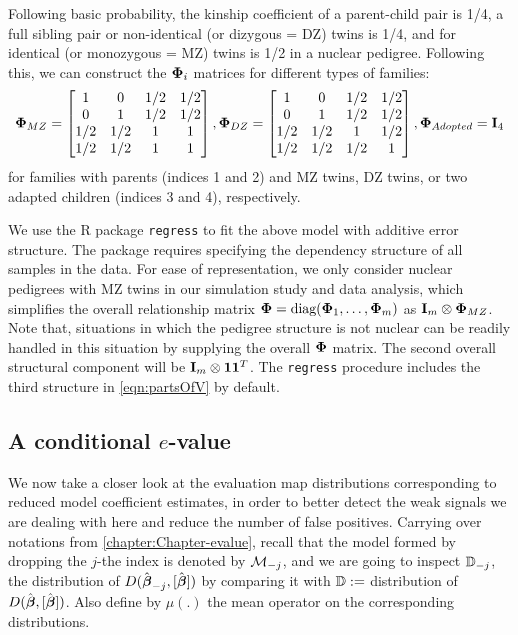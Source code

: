 Following basic probability, the kinship coefficient of a parent-child pair is 1/4, a full sibling pair or non-identical (or dizygous = DZ) twins is 1/4, and for identical (or monozygous = MZ) twins is 1/2 in a nuclear pedigree. Following this, we can construct the ${\boldsymbol{\Phi}}_i$ matrices for different types of families:
%
\begin{align*}
{\boldsymbol{\Phi}}_{MZ} = \begin{bmatrix}
1 & 0 & 1/2 & 1/2 \\
0 & 1 & 1/2 & 1/2 \\
1/2 & 1/2 & 1 & 1\\
1/2 & 1/2 & 1 & 1
\end{bmatrix},
{\boldsymbol{\Phi}}_{DZ} = \begin{bmatrix}
1 & 0 & 1/2 & 1/2 \\
0 & 1 & 1/2 & 1/2 \\
1/2 & 1/2 & 1 & 1/2\\
1/2 & 1/2 & 1/2 & 1
\end{bmatrix},
{\boldsymbol{\Phi}}_{Adopted} = {\mathbf{I}}_4
\end{align*}
%
for families with parents (indices 1 and 2) and MZ twins, DZ twins, or two adapted children (indices 3 and 4), respectively.

We use the R package \texttt{regress} to fit the above model with additive error structure. The package requires specifying the dependency structure of all samples in the data. For ease of representation, we only consider nuclear pedigrees with MZ twins in our simulation study and data analysis, which simplifies the overall relationship matrix ${\boldsymbol{\Phi}} = \text{diag} ( {\boldsymbol{\Phi}}_1, \ldots, {\boldsymbol{\Phi}}_m)$ as ${\mathbf{I}}_m \otimes {\boldsymbol{\Phi}}_{MZ}$. Note that, situations in which the pedigree structure is not nuclear can be readily handled in this situation by supplying the overall ${\boldsymbol{\Phi}}$ matrix. The second overall structural component will be  ${\mathbf{I}}_m \otimes {\bf 1} {\bf 1}^T$. The \texttt{regress} procedure includes the third structure in \ref{eqn:partsOfV} by default.

\subsection{A conditional $e$-value}
We now take a closer look at the evaluation map distributions corresponding to reduced model coefficient estimates, in order to better detect the weak signals we are dealing with here and reduce the number of false positives. Carrying over notations from \ref{chapter:Chapter-evalue}, recall that the model formed by dropping the $j$-the index is denoted by ${\cal{M}}_{-j}$, and we are going to inspect ${\mathbb{D}}_{-j}$, the distribution of $D( \hat {{\boldsymbol{\beta}}}_{-j}, [\hat {{\boldsymbol{\beta}}}] ) $ by comparing it with ${\mathbb{D}} :=$ distribution of $D( \hat {{\boldsymbol{\beta}}}, [\hat {{\boldsymbol{\beta}}}] ) $. Also define by $\mu(.)$ the mean operator on the corresponding distributions.

